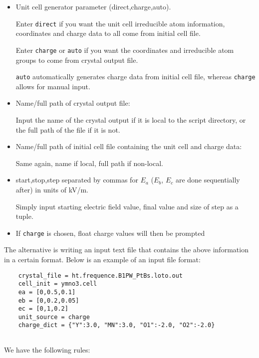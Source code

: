 \begin{itemize}
	\item Unit cell generator parameter (direct,charge,auto).
	
	Enter \texttt{direct} if you want the unit cell irreducible atom information, coordinates and charge data to all come from initial cell file.
	
	Enter \texttt{charge} or \texttt{auto} if you want the coordinates and irreducible atom groups to come from crystal output file.
	
	\texttt{auto} automatically generates charge data from initial cell file, whereas \texttt{charge} allows for manual input.
	
	\item Name/full path of crystal output file:
	
	Input the name of the crystal output if it is local to the script directory, or the full path of the file if it is not.
	
	\item Name/full path of initial cell file containing the unit cell and charge data:
	
	Same again, name if local, full path if non-local.
	
	\item start,stop,step separated by commas for $E_a$ ($E_b$, $E_c$ are done sequentially after) in units of kV/m.
	
	Simply input starting electric field value, final value and size of step as a tuple.
	
	\item If \texttt{charge} is chosen, float charge values will then be prompted
\end{itemize}

The alternative is writing an input text file that contains the above information in a certain format. Below is an example of an input file format:

\begin{lstlisting}
	crystal_file = ht.frequence.B1PW_PtBs.loto.out
	cell_init = ymno3.cell
	ea = [0,0.5,0.1]
	eb = [0,0.2,0.05]
	ec = [0,1,0.2]
	unit_source = charge
	charge_dict = {"Y":3.0, "MN":3.0, "O1":-2.0, "O2":-2.0}
	
\end{lstlisting}

We have the following rules:

